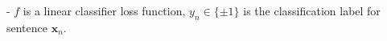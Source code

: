 - $f$ is a linear classifier loss function, $y_{n} \in\{ \pm 1\}$ is the classification label for sentence $\mathbf{x}_{n}$.





